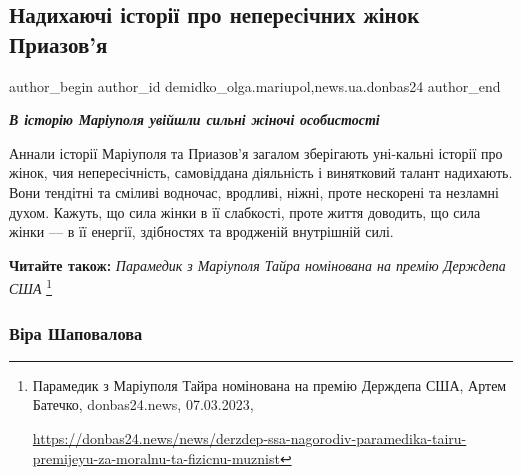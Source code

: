  
 
 
 
 
 
\subsection{Надихаючі історії про непересічних жінок Приазов'я}
\label{sec:07_03_2023.stz.news.ua.donbas24.1.nadyhajuchi_istorii_zhinky_priazovja}
 
\ifcmt
 author_begin
   author_id demidko_olga.mariupol,news.ua.donbas24
 author_end
\fi


\begin{center}
  \em\color{blue}\bfseries\Large
  В історію Маріуполя увійшли сильні жіночі особистості
\end{center}

Аннали історії Маріуполя та Приазов'я загалом зберігають уні\hyp{}кальні історії про
жінок, чия непересічність, самовіддана діяльність і винятковий талант
надихають. Вони тендітні та сміливі водночас, вродливі, ніжні, проте нескорені
та незламні духом. Кажуть, що сила жінки в її слабкості, проте життя доводить,
що сила жінки — в її енергії, здібностях та вродженій внутрішній силі.

\textbf{Читайте також:} \emph{Парамедик з Маріуполя Тайра номінована на премію Держдепа США}%
\footnote{Парамедик з Маріуполя Тайра номінована на премію Держдепа США, Артем Батечко, donbas24.news, 07.03.2023, \par%
\url{https://donbas24.news/news/derzdep-ssa-nagorodiv-paramedika-tairu-premijeyu-za-moralnu-ta-fizicnu-muznist}%
}

\subsubsection{Віра Шаповалова}

